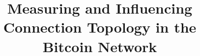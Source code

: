 \documentclass[10pt,twocolumn]{article}
\begin{document}
\title{Measuring and Influencing Connection Topology \break in the Bitcoin Network}
\date{\vspace{-15mm}}








\maketitle

\begin{abstract}
\end{abstract}












%








\appendix

\end{document}
